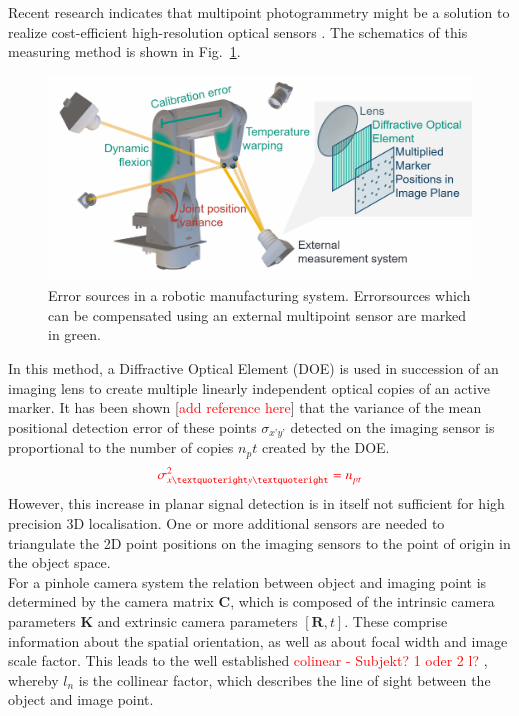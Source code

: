 \documentclass[5p,times,procedia]{elsarticle}
\begin{document}
Recent research indicates that multipoint photogrammetry might be a solution to realize cost-efficient high-resolution optical sensors \cite{Hartlieb_2021}.
The schematics of this measuring method is shown in Fig.~\ref{fig:MeasSys_Errors}.
\begin{figure}[h]
	\centering
	\includegraphics[width=\columnwidth]{graphics/error_sources.png}
	\caption{Error sources in a robotic manufacturing system. Errorsources which can be compensated using an external multipoint  sensor are marked in green.}
	\label{fig:MeasSys_Errors}
\end{figure}
In this method, a Diffractive Optical Element (DOE) is used in succession of an imaging lens to create multiple linearly independent optical copies of an active marker.
It has been shown [\textcolor{red}{add reference here}] that the variance of the mean positional detection error of these points $\sigma_{x’y’}$ detected on the imaging sensor is proportional to the number of copies $n_pt$ created by the DOE.
\begin{equation}
	\textcolor{red}{\sigma_{x’y’}^2 = n_{pt}^{}}
\end{equation}
However, this increase in planar signal detection is in itself not sufficient for high precision 3D localisation. One or more additional sensors are needed to triangulate the 2D point positions on the imaging sensors to the point of origin in the object space. \\
For a pinhole camera system the relation between object and imaging point is determined by the camera matrix $\mathbf{C}$, which is composed of the intrinsic camera parameters $\mathbf{K}$ and extrinsic camera parameters $[\mathbf{R}, t]$.
These comprise information about the spatial orientation, as well as about focal width and image scale factor.
This leads to the well established \textcolor{red}{colinear - Subjekt? 1 oder 2 l?} \cite{Luhmann2003}, whereby $l_n$ is the collinear factor, which describes the line of sight between the object and image point.
\end{document}
